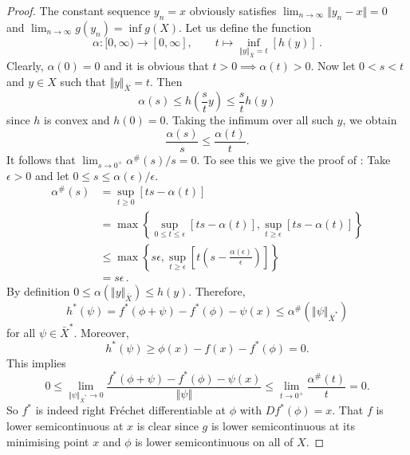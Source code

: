 \documentclass[
	paper=A4,
	pagesize=auto,
	fontsize=12pt
]{scrartcl}
\theoremstyle{plain}
\theoremstyle{remark}
\theoremstyle{definition}
\begin{document}
\begin{proof}
The constant sequence $y_n = x$ obviously satisfies $\lim_{n \to \infty} \Vert y_n - x \Vert = 0$ and $\lim_{n \to \infty} g(y_n) = \inf g(X)$.
Let us define the function
%
\begin{equation}
\alpha : [0,\infty) \to [0,\infty], \qquad
t \mapsto \inf_{\Vert y \Vert_{\bar{X}} = t} \left[ h \left( y \right) \right] \, .
\end{equation}
%
Clearly, $\alpha(0) = 0$ and it is obvious that $t > 0 \implies \alpha(t) > 0$.
%
Now let $0<s<t$ and $y\in X$ such that $\Vert y \Vert_{\bar{X}} = t.$
Then
%
\begin{equation}
\alpha \left( s \right) 
\leq
h \left( \frac{s}{t} y \right)
\leq
\frac{s}{t} h \left( y \right)
\end{equation}
%
since $h$ is convex and $h(0) = 0$.
Taking the infimum over all such $y$, we obtain 
%
\begin{equation}
\frac{\alpha(s)}{s} \leq \frac{\alpha(t)}{t}.
\end{equation}
%
It follows that $\lim_{s\to 0^+} \alpha^\#(s) / s =0.$ 
To see this we give the proof of \cite[Lemma 3.3.1 (iii)]{src:Zalinescu:ConvexAnalysisInGeneralVectorSpaces}:
Take $\epsilon >0$ and let $0\le s \le \alpha(\epsilon) / \epsilon$.
%
\begin{equation}
    \begin{aligned}
        \alpha^\#(s) &= \sup_{t\ge 0} \left[ ts -\alpha\left( t \right) \right] \\
                    &= \max \left\{\sup_{0\le t \le \epsilon} \left[ t s -\alpha \left( t \right) \right] , \sup_{t\ge \epsilon} \left[t s - \alpha \left( t \right) \right] \right\} \\
                    &\le \max \left\{ s \epsilon , \sup_{t\ge \epsilon} \left[ t \left( s - \frac{\alpha \left( \epsilon \right)}{\epsilon }\right) \right] \right\} \\
                    &= s \epsilon \,.
    \end{aligned}
\end{equation}
%
By definition $0 \leq \alpha(\Vert y \Vert_{\bar{X}}) \leq h( y )$.
Therefore,
%
\begin{equation}
h^* \left( \psi \right)
=
f^* \left( \phi + \psi \right) - f^* \left( \phi \right) - \psi \left( x \right)
\le
\alpha^\# \left( \left\Vert \psi \right\Vert_{\bar{X}^*} \right)
\end{equation}
%
for all $\psi \in \bar{X}^*$.
Moreover,
%
\begin{equation}
h^* \left( \psi \right)
\ge
\phi \left( x \right) - f \left( x \right) - f^* \left( \phi \right)
=
0.
\end{equation}
%
This implies
%
\begin{equation}
0 \le 
\lim_{\Vert \psi \Vert_{\bar{X}^*} \to 0} \frac{f^* \left( \phi + \psi \right)-f^* \left( \phi \right) - \psi \left( x \right)}{\Vert \psi \Vert} 
\leq
\lim_{t \to 0^+}\frac{\alpha^\#(t)}{t} = 0.
\end{equation}
%
So $f^*$ is indeed right Fréchet differentiable at $\phi$ with $D f^*(\phi) = x$.
That $f$ is lower semicontinuous at $x$ is clear since $g$ is lower semicontinuous at its minimising point $x$ and $\phi$ is lower semicontinuous on all of $X$.
\end{proof}
%
\end{document}
